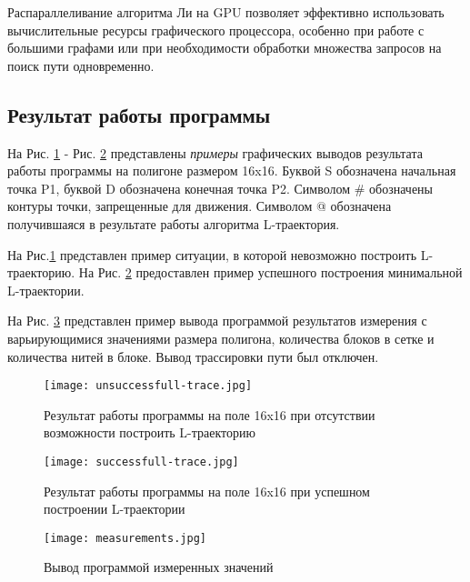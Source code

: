 \documentclass[a4paper, 12pt]{article}
\begin{document}
    Распараллеливание алгоритма Ли на GPU позволяет эффективно использовать вычислительные ресурсы графического процессора, особенно при работе с большими графами или при необходимости обработки множества запросов на поиск пути одновременно.
 
    \subsection{Результат работы программы}
     На Рис. \ref{unsuccessfull-trace} - Рис. \ref{successfull-trace} представлены \textit{примеры} графических выводов результата работы программы на полигоне размером 16x16. Буквой S обозначена начальная точка P1, буквой D обозначена конечная точка P2. Символом \# обозначены контуры точки, запрещенные для движения. Символом @ обозначена получившаяся в результате работы алгоритма L-траектория.
    
    На Рис.\ref{unsuccessfull-trace} представлен пример ситуации, в которой невозможно построить L-траекторию. На Рис. \ref{successfull-trace} предоставлен пример успешного построения минимальной L-траектории.

    На Рис. \ref{measurements} представлен пример вывода программой результатов измерения с варьирующимися значениями размера полигона, количества блоков в сетке и количества нитей в блоке. Вывод трассировки пути был отключен.

    \begin{figure}[h!]
        \centering
        \texttt{[image: unsuccessfull-trace.jpg]}
        \caption{Результат работы программы на поле 16x16 при \linebreak отсутствии возможности построить L-траекторию}	
        \label{unsuccessfull-trace}
    \end{figure}

    \clearpage
    \begin{figure}[h!]
        \centering
        \texttt{[image: successfull-trace.jpg]}
        \caption{Результат работы программы на поле 16x16 \linebreak при успешном построении L-траектории}	 
        \label{successfull-trace}
    \end{figure}

    \begin{figure}[h!]
        \centering
        \texttt{[image: measurements.jpg]}
        \caption{Вывод программой измеренных значений}	
        \label{measurements}
    \end{figure}
\end{document}
